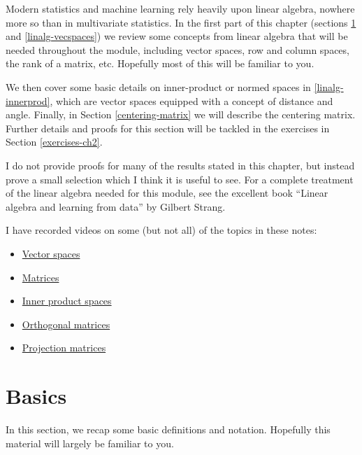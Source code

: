 \documentclass[
]{book}
\providecommand{\tightlist}{%
  \setlength{\itemsep}{0pt}\setlength{\parskip}{0pt}}
\theoremstyle{definition}
\theoremstyle{definition}
\theoremstyle{definition}
\theoremstyle{definition}
\theoremstyle{remark}
\begin{document}
Modern statistics and machine learning rely heavily upon linear algebra, nowhere more so than in multivariate statistics. In the first part of this chapter (sections \ref{linalg-basics} and \ref{linalg-vecspaces}) we review some concepts from linear algebra that will be needed throughout the module, including vector spaces, row and column spaces, the rank of a matrix, etc. Hopefully most of this will be familiar to you.

We then cover some basic details on inner-product or normed spaces in \ref{linalg-innerprod}, which are vector spaces equipped with a concept of distance and angle.
Finally, in Section \ref{centering-matrix} we will describe the centering matrix. Further details and proofs for this section will be tackled in the exercises in Section \ref{exercises-ch2}.

I do not provide proofs for many of the results stated in this chapter, but instead prove a small selection which I think it is useful to see. For a complete treatment of the linear algebra needed for this module, see the excellent book ``Linear algebra and learning from data'' by Gilbert Strang.

I have recorded videos on some (but not all) of the topics in these notes:

\begin{itemize}
\tightlist
\item
  \href{https://mediaspace.nottingham.ac.uk/media/Vector+Spaces/1_48xqrp04}{Vector spaces}
\item
  \href{https://mediaspace.nottingham.ac.uk/media/Matrices/1_nqo2u7zs}{Matrices}
\item
  \href{https://mediaspace.nottingham.ac.uk/media/Inner+Product+Spaces/1_nhcbybg3}{Inner product spaces}
\item
  \href{https://mediaspace.nottingham.ac.uk/media/Orthogonal+Matrices/1_rr2ervcs}{Orthogonal matrices}
\item
  \href{https://mediaspace.nottingham.ac.uk/media/Projection/1_soh726fg}{Projection matrices}
\end{itemize}

\hypertarget{linalg-basics}{%
\section{Basics}\label{linalg-basics}}

In this section, we recap some basic definitions and notation. Hopefully this material will largely be familiar to you.
\end{document}
